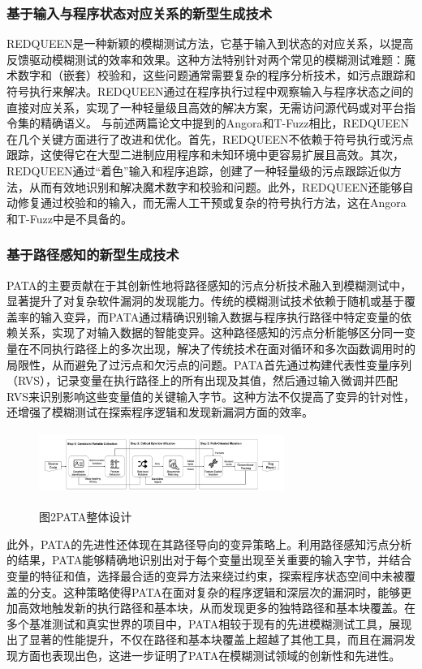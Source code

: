 \documentclass[10.5pt,compsoc]{CjC}
\theoremstyle{mystyle}
\begin{document}
\subsubsection{基于输入与程序状态对应关系的新型生成技术}
REDQUEEN\cite{redqueen}是一种新颖的模糊测试方法，它基于输入到状态的对应关系，以提高反馈驱动模糊测试的效率和效果。这种方法特别针对两个常见的模糊测试难题：魔术数字和（嵌套）校验和，这些问题通常需要复杂的程序分析技术，如污点跟踪和符号执行来解决。REDQUEEN通过在程序执行过程中观察输入与程序状态之间的直接对应关系，实现了一种轻量级且高效的解决方案，无需访问源代码或对平台指令集的精确语义。
	与前述两篇论文中提到的Angora和T-Fuzz相比，REDQUEEN在几个关键方面进行了改进和优化。首先，REDQUEEN不依赖于符号执行或污点跟踪，这使得它在大型二进制应用程序和未知环境中更容易扩展且高效。其次，REDQUEEN通过“着色”输入和程序追踪，创建了一种轻量级的污点跟踪近似方法，从而有效地识别和解决魔术数字和校验和问题。此外，REDQUEEN还能够自动修复通过校验和的输入，而无需人工干预或复杂的符号执行方法，这在Angora和T-Fuzz中是不具备的。
  \vspace {10mm}
  
\subsubsection{基于路径感知的新型生成技术}
PATA\cite{PATA}的主要贡献在于其创新性地将路径感知的污点分析技术融入到模糊测试中，显著提升了对复杂软件漏洞的发现能力。传统的模糊测试技术依赖于随机或基于覆盖率的输入变异，而PATA通过精确识别输入数据与程序执行路径中特定变量的依赖关系，实现了对输入数据的智能变异。这种路径感知的污点分析能够区分同一变量在不同执行路径上的多次出现，解决了传统技术在面对循环和多次函数调用时的局限性，从而避免了过污点和欠污点的问题。PATA首先通过构建代表性变量序列（RVS），记录变量在执行路径上的所有出现及其值，然后通过输入微调并匹配RVS来识别影响这些变量值的关键输入字节。这种方法不仅提高了变异的针对性，还增强了模糊测试在探索程序逻辑和发现新漏洞方面的效率。

\begin{figure}[htbp]
\centerline{\includegraphics[width=3.15in,height=0.8in]{./image/PATA.png}}
\begin{center}
  图2\quad  PATA整体设计\cite{PATA}
\end{center}
\label{fig2}
\end{figure}

此外，PATA的先进性还体现在其路径导向的变异策略上。利用路径感知污点分析的结果，PATA能够精确地识别出对于每个变量出现至关重要的输入字节，并结合变量的特征和值，选择最合适的变异方法来绕过约束，探索程序状态空间中未被覆盖的分支。这种策略使得PATA在面对复杂的程序逻辑和深层次的漏洞时，能够更加高效地触发新的执行路径和基本块，从而发现更多的独特路径和基本块覆盖。在多个基准测试和真实世界的项目中，PATA相较于现有的先进模糊测试工具，展现出了显著的性能提升，不仅在路径和基本块覆盖上超越了其他工具，而且在漏洞发现方面也表现出色，这进一步证明了PATA在模糊测试领域的创新性和先进性。
\vspace {10mm}
\end{document}
